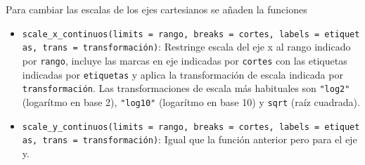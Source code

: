 \documentclass[
  a4paper,
]{scrreport}
\theoremstyle{definition}
\theoremstyle{definition}
\theoremstyle{remark}
\begin{document}
Para cambiar las escalas de los ejes cartesianos se añaden la funciones

\begin{itemize}
\item
  \texttt{scale\_x\_continuos(limits\ =\ rango,\ breaks\ =\ cortes,\ labels\ =\ etiquetas,\ trans\ =\ transformación)}:
  Restringe escala del eje x al rango indicado por \texttt{rango},
  incluye las marcas en eje indicadas por \texttt{cortes} con las
  etiquetas indicadas por \texttt{etiquetas} y aplica la transformación
  de escala indicada por \texttt{transformación}. Las transformaciones
  de escala más habituales son \texttt{"log2"} (logarítmo en base 2),
  \texttt{"log10"} (logarítmo en base 10) y \texttt{sqrt} (raíz
  cuadrada).
\item
  \texttt{scale\_y\_continuos(limits\ =\ rango,\ breaks\ =\ cortes,\ labels\ =\ etiquetas,\ trans\ =\ transformación)}:
  Igual que la función anterior pero para el eje y.
\end{itemize}
\end{document}
